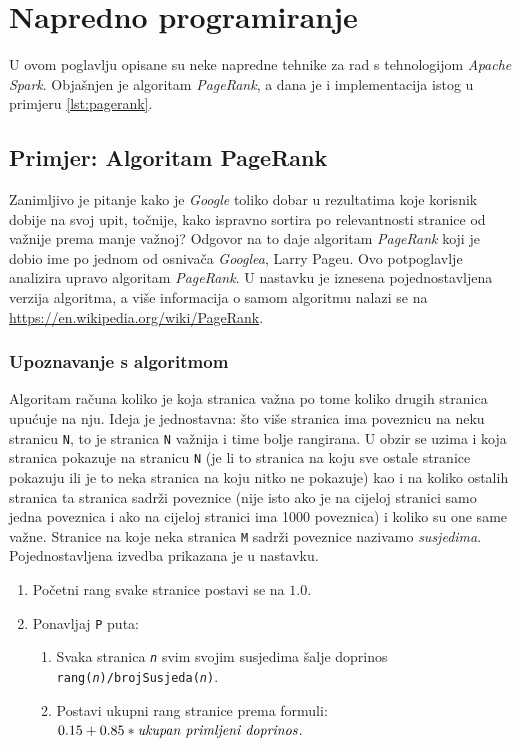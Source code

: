 \documentclass[times, utf8, zavrsni, numeric]{fer}
\begin{document}
\chapter{Napredno programiranje}
U ovom poglavlju opisane su neke napredne tehnike za rad s tehnologijom \emph{Apache Spark}. Objašnjen je algoritam \emph{PageRank}, a dana je i implementacija istog u primjeru \ref{lst:pagerank}.
\section{Primjer: Algoritam PageRank}
Zanimljivo je pitanje kako je \emph{Google} toliko dobar u rezultatima koje korisnik dobije na svoj upit, točnije, kako ispravno sortira po relevantnosti stranice od važnije prema manje važnoj? Odgovor na to daje algoritam \emph{PageRank} koji je dobio ime po jednom od osnivača \emph{Googlea}, Larry Pageu. Ovo potpoglavlje analizira upravo algoritam \emph{PageRank}. U nastavku je iznesena pojednostavljena verzija algoritma, a više informacija o samom algoritmu nalazi se na \url{https://en.wikipedia.org/wiki/PageRank}. 

\subsection{Upoznavanje s algoritmom}
Algoritam računa koliko je koja stranica važna po tome koliko drugih stranica upućuje na nju. Ideja je jednostavna: što više stranica ima poveznicu na neku stranicu \texttt{N}, to je stranica \texttt{N} važnija i time bolje rangirana. U obzir se uzima i koja stranica pokazuje na stranicu \texttt{N} (je li to stranica na koju sve ostale stranice pokazuju ili je to neka stranica na koju nitko ne pokazuje) kao i na koliko ostalih stranica ta stranica sadrži poveznice (nije isto ako je na cijeloj stranici samo jedna poveznica i ako na cijeloj stranici ima 1000 poveznica) i koliko su one same važne. Stranice na koje neka stranica \texttt{M} sadrži poveznice nazivamo \emph{susjedima}.
Pojednostavljena izvedba prikazana je u nastavku.

\begin{enumerate}[label*=\arabic*.]
\item Početni rang svake stranice postavi se na $1.0$.
\item Ponavljaj \texttt{P} puta:
\begin{enumerate}[label*=\arabic*.]
\item Svaka stranica \texttt{\emph{n}} svim svojim susjedima šalje doprinos \texttt{rang(\emph{n})/brojSusjeda(\emph{n})}.
\item Postavi ukupni rang stranice prema formuli: $0.15 + 0.85*\emph{ukupan primljeni doprinos}$.
\end{enumerate}
\end{enumerate}
\end{document}
